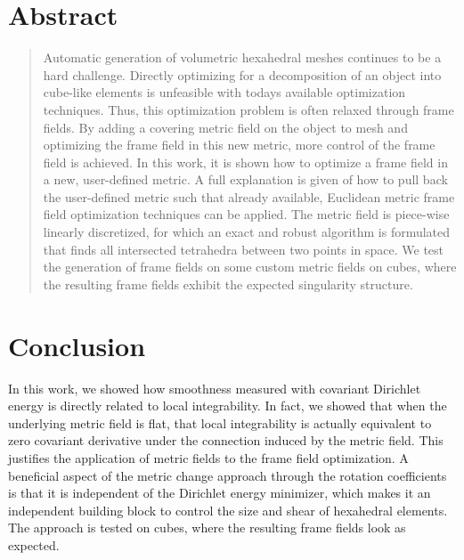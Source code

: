 \documentclass[a4paper,twoside,openright,11pt]{report}
\begin{document}
\chapter*{\centering Abstract}
\begin{quote}\noindent
  Automatic generation of volumetric hexahedral meshes continues
  to be a hard challenge. Directly optimizing for a decomposition 
  of an object into cube-like elements is unfeasible with todays
  available optimization techniques. Thus, this optimization problem is
  often relaxed through frame fields. By adding a covering
  metric field on the object to mesh and optimizing the frame field
  in this new metric, more control of the frame field is achieved.
  In this work, it is shown how to optimize a frame field in a
  new, user-defined metric. A full explanation is given of how to pull back
  the user-defined metric such that already available, Euclidean metric frame field
  optimization techniques can be applied. The metric field is
  piece-wise linearly discretized, for which an exact and robust algorithm
  is formulated that finds all intersected tetrahedra between two points in space.
  We test the generation of frame fields on some custom metric fields
  on cubes, where the resulting frame fields exhibit the expected singularity structure.

\end{quote}

\cleardoublepage


\tableofcontents


\cleardoublepage









\chapter{Conclusion}
\label{ch:conclusion}
In this work, we showed how smoothness measured with covariant Dirichlet
energy is directly related to local integrability. In fact, we showed
that when the underlying metric field is flat, that local integrability
is actually equivalent to zero covariant derivative under the connection
induced by the metric field. This justifies
the application of metric fields to the frame field optimization.
A beneficial aspect of the metric change approach through the rotation coefficients is that it
is independent of the Dirichlet energy minimizer, which makes it an
independent building block to control the size and shear of hexahedral elements. 
The approach is tested on cubes, where the resulting frame fields
look as expected.
\end{document}
